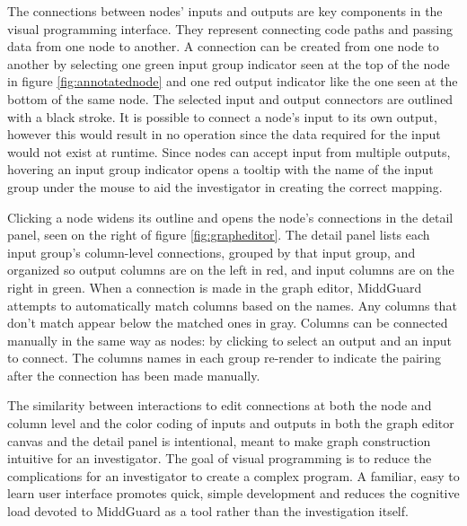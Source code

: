\documentclass[midd]{thesis}
\begin{document}
The connections between nodes' inputs and outputs are key components in the
visual programming interface. They represent connecting code paths and passing
data from one node to another. A connection can be created from one node to
another by selecting one green input group indicator seen at the top of the node
in figure \ref{fig:annotatednode} and one red output indicator like the one seen
at the bottom of the same node. The selected input and output connectors are
outlined with a black stroke. It is possible to connect a node's input to its
own output, however this would result in no operation since the data required
for the input would not exist at runtime. Since nodes can accept input from
multiple outputs, hovering an input group indicator opens a tooltip with the
name of the input group under the mouse to aid the investigator in creating the
correct mapping.

Clicking a node widens its outline and opens the node's connections in the
detail panel, seen on the right of figure \ref{fig:grapheditor}. The detail
panel lists each input group's column-level connections, grouped by that input
group, and organized so output columns are on the left in red, and input columns
are on the right in green. When a connection is made in the graph editor,
MiddGuard attempts to automatically match columns based on the names. Any
columns that don't match appear below the matched ones in gray. Columns can be
connected manually in the same way as nodes: by clicking to select an output and
an input to connect. The columns names in each group re-render to indicate the
pairing after the connection has been made manually.

The similarity between interactions to edit connections at both the node and
column level and the color coding of inputs and outputs in both the graph editor
canvas and the detail panel is intentional, meant to make graph construction
intuitive for an investigator. The goal of visual programming is to reduce the
complications for an investigator to create a complex program. A familiar, easy
to learn user interface promotes quick, simple development and reduces the
cognitive load devoted to MiddGuard as a tool rather than the investigation
itself.
\end{document}
